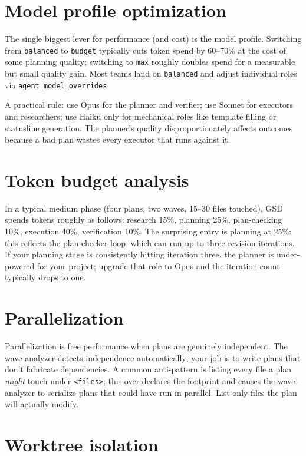 \documentclass[11pt,letterpaper,openany]{book}
\begin{document}
\section{Model profile optimization}

The single biggest lever for performance (and cost) is the model profile. Switching from \texttt{balanced} to \texttt{budget} typically cuts token spend by 60--70\% at the cost of some planning quality; switching to \texttt{max} roughly doubles spend for a measurable but small quality gain. Most teams land on \texttt{balanced} and adjust individual roles via \texttt{agent\_model\_overrides}.

A practical rule: use Opus for the planner and verifier; use Sonnet for executors and researchers; use Haiku only for mechanical roles like template filling or statusline generation. The planner's quality disproportionately affects outcomes because a bad plan wastes every executor that runs against it.

\section{Token budget analysis}

In a typical medium phase (four plans, two waves, 15--30 files touched), GSD spends tokens roughly as follows: research 15\%, planning 25\%, plan-checking 10\%, execution 40\%, verification 10\%. The surprising entry is planning at 25\%: this reflects the plan-checker loop, which can run up to three revision iterations. If your planning stage is consistently hitting iteration three, the planner is under-powered for your project; upgrade that role to Opus and the iteration count typically drops to one.

\section{Parallelization}

Parallelization is free performance when plans are genuinely independent. The wave-analyzer detects independence automatically; your job is to write plans that don't fabricate dependencies. A common anti-pattern is listing every file a plan \emph{might} touch under \texttt{<files>}; this over-declares the footprint and causes the wave-analyzer to serialize plans that could have run in parallel. List only files the plan will actually modify.

\section{Worktree isolation}
\end{document}

